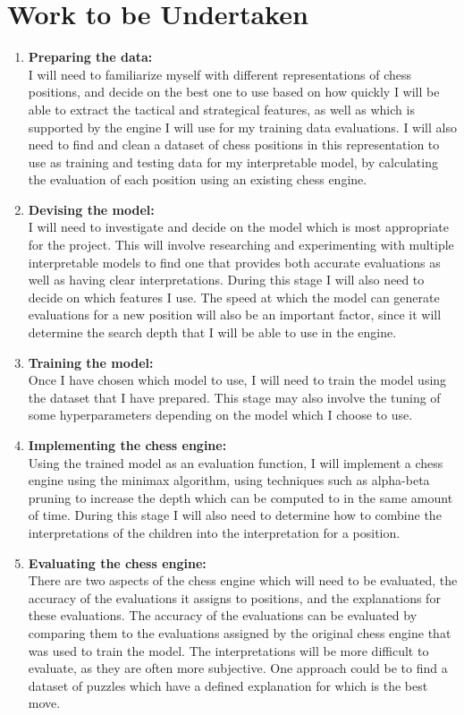 \documentclass[12pt,a4paper]{article}
\begin{document}
\section*{Work to be Undertaken}
\begin{enumerate}
    \item \textbf{Preparing the data:}
    \\I will need to familiarize myself with different representations of chess positions, and decide on the best one to use based on how quickly I will be able to extract the tactical and strategical features, as well as which is supported by the engine I will use for my training data evaluations. I will also need to find and clean a dataset of chess positions in this representation to use as training and testing data for my interpretable model, by calculating the evaluation of each position using an existing chess engine.
    \item \textbf{Devising the model:}
    \\I will need to investigate and decide on the model which is most appropriate for the project. This will involve researching and experimenting with multiple interpretable models to find one that provides both accurate evaluations as well as having clear interpretations. During this stage I will also need to decide on which features I use. The speed at which the model can generate evaluations for a new position will also be an important factor, since it will determine the search depth that I will be able to use in the engine.
    \item \textbf{Training the model:}
    \\Once I have chosen which model to use, I will need to train the model using the dataset that I have prepared. This stage may also involve the tuning of some hyperparameters depending on the model which I choose to use.
    \item \textbf{Implementing the chess engine:}
    \\Using the trained model as an evaluation function, I will implement a chess engine using the minimax algorithm, using techniques such as alpha-beta pruning to increase the depth which can be computed to in the same amount of time. During this stage I will also need to determine how to combine the interpretations of the children into the interpretation for a position.
    \item \textbf{Evaluating the chess engine:}
    \\There are two aspects of the chess engine which will need to be evaluated, the accuracy of the evaluations it assigns to positions, and the explanations for these evaluations. The accuracy of the evaluations can be evaluated by comparing them to the evaluations assigned by the original chess engine that was used to train the model. The interpretations will be more difficult to evaluate, as they are often more subjective. One approach could be to find a dataset of puzzles which have a defined explanation for which is the best move.

\end{enumerate}
\end{document}
